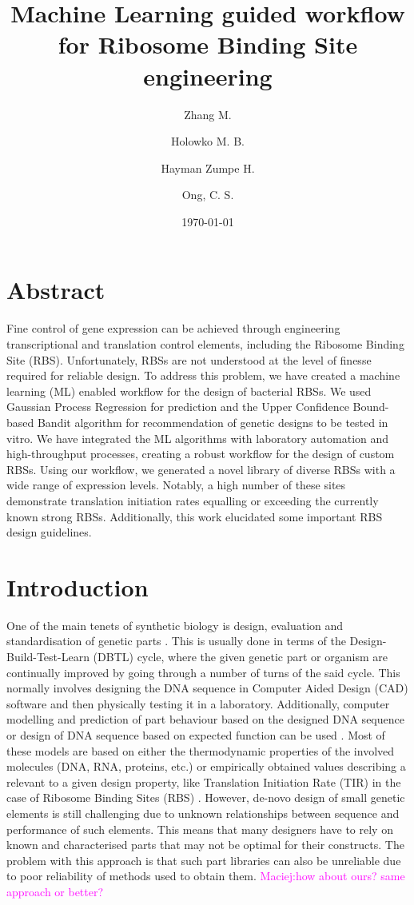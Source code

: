 \documentclass{article}
\title{Machine Learning guided workflow for Ribosome Binding Site engineering}
\author[1,2]{Zhang M.}
\author[3]{Holowko M. B.}
\author[3]{Hayman Zumpe H.}
\author[1,2,4]{Ong, C. S.}
\affil[1]{Machine Learning and Artificial Intelligence Future Science Platform, CSIRO}
\affil[2]{Australian National University}
\affil[3]{CSIRO Synthetic Biology Future Science Platform, CSIRO Land and Water}
\affil[4]{Data61, CSIRO}
\date{\today{}}
\newcommand{\mengyan}[1]{\textcolor{magenta}{#1}}
\begin{document}
\maketitle

\section*{Abstract}

Fine control of gene expression can be achieved through engineering transcriptional and translation control elements, including the Ribosome Binding Site (RBS).
Unfortunately, RBSs are not understood at the level of finesse required for reliable design. 
To address this problem, we have created a machine learning (ML) enabled workflow for the design of bacterial RBSs.
We used Gaussian Process Regression for prediction and the Upper Confidence Bound-based Bandit algorithm for recommendation of genetic designs to be tested in vitro.
We have integrated the ML algorithms with laboratory automation and high-throughput processes, creating a robust workflow for the design of custom RBSs.
Using our workflow, we generated a novel library of diverse RBSs with a wide range of expression levels.
Notably, a high number of these sites demonstrate translation initiation rates equalling or exceeding the currently known strong RBSs.
Additionally, this work elucidated some important RBS design guidelines.

\section{Introduction}

One of the main tenets of synthetic biology is design, evaluation and standardisation of genetic parts \cite{Brophy2014,Canton2008,Stanton2014}.
This is usually done in terms of the Design-Build-Test-Learn (DBTL) cycle, where the given genetic part or organism are continually improved by going through a number of turns of the said cycle.
This normally involves designing the DNA sequence in Computer Aided Design (CAD) software and then physically testing it in a laboratory. 
Additionally, computer modelling and prediction of part behaviour based on the designed DNA sequence or design of DNA sequence based on expected function can be used \cite{Yeoh2019,Nielsen2016}.
Most of these models are based on either the thermodynamic properties of the involved molecules (DNA, RNA, proteins, etc.) or empirically obtained values describing a relevant to a given design property, like Translation Initiation Rate (TIR) in the case of Ribosome Binding Sites (RBS) \cite{Xia1998,Chen2013,Reeve2014}.
However, de-novo design of small genetic elements is still challenging due to unknown relationships between sequence and performance of such elements. 
This means that many designers have to rely on known and characterised parts that may not be optimal for their constructs.
The problem with this approach is that such part libraries can also be unreliable due to poor reliability of methods used to obtain them.
\mengyan{Maciej:how about ours? same approach or better?}
\end{document}
